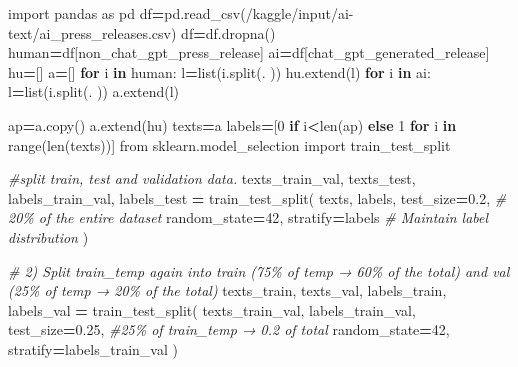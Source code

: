 \documentclass[
]{article}
\newenvironment{Shaded}{\begin{snugshade}}{\end{snugshade}}
\newcommand{\BuiltInTok}[1]{#1}
\newcommand{\CommentTok}[1]{\textcolor[rgb]{0.56,0.35,0.01}{\textit{#1}}}
\newcommand{\ControlFlowTok}[1]{\textcolor[rgb]{0.13,0.29,0.53}{\textbf{#1}}}
\newcommand{\DecValTok}[1]{\textcolor[rgb]{0.00,0.00,0.81}{#1}}
\newcommand{\FloatTok}[1]{\textcolor[rgb]{0.00,0.00,0.81}{#1}}
\newcommand{\ImportTok}[1]{#1}
\newcommand{\KeywordTok}[1]{\textcolor[rgb]{0.13,0.29,0.53}{\textbf{#1}}}
\newcommand{\NormalTok}[1]{#1}
\newcommand{\OperatorTok}[1]{\textcolor[rgb]{0.81,0.36,0.00}{\textbf{#1}}}
\newcommand{\StringTok}[1]{\textcolor[rgb]{0.31,0.60,0.02}{#1}}
\begin{document}
\begin{Shaded}
\begin{Highlighting}[]
\ImportTok{import}\NormalTok{ pandas }\ImportTok{as}\NormalTok{ pd}
\NormalTok{df}\OperatorTok{=}\NormalTok{pd.read\_csv(}\StringTok{\textquotesingle{}/kaggle/input/ai{-}text/ai\_press\_releases.csv\textquotesingle{}}\NormalTok{)}
\NormalTok{df}\OperatorTok{=}\NormalTok{df.dropna()}
\NormalTok{human}\OperatorTok{=}\NormalTok{df[}\StringTok{\textquotesingle{}non\_chat\_gpt\_press\_release\textquotesingle{}}\NormalTok{]}
\NormalTok{ai}\OperatorTok{=}\NormalTok{df[}\StringTok{\textquotesingle{}chat\_gpt\_generated\_release\textquotesingle{}}\NormalTok{]}
\NormalTok{hu}\OperatorTok{=}\NormalTok{[]}
\NormalTok{a}\OperatorTok{=}\NormalTok{[]}
\ControlFlowTok{for}\NormalTok{ i }\KeywordTok{in}\NormalTok{ human:}
\NormalTok{    l}\OperatorTok{=}\BuiltInTok{list}\NormalTok{(i.split(}\StringTok{\textquotesingle{}. \textquotesingle{}}\NormalTok{))}
\NormalTok{    hu.extend(l)}
\ControlFlowTok{for}\NormalTok{ i }\KeywordTok{in}\NormalTok{ ai:}
\NormalTok{    l}\OperatorTok{=}\BuiltInTok{list}\NormalTok{(i.split(}\StringTok{\textquotesingle{}. \textquotesingle{}}\NormalTok{))}
\NormalTok{    a.extend(l)}

\NormalTok{ap}\OperatorTok{=}\NormalTok{a.copy()}
\NormalTok{a.extend(hu)}
\NormalTok{texts}\OperatorTok{=}\NormalTok{a}
\NormalTok{labels}\OperatorTok{=}\NormalTok{[}\DecValTok{0} \ControlFlowTok{if}\NormalTok{ i}\OperatorTok{\textless{}}\BuiltInTok{len}\NormalTok{(ap) }\ControlFlowTok{else} \DecValTok{1} \ControlFlowTok{for}\NormalTok{ i }\KeywordTok{in} \BuiltInTok{range}\NormalTok{(}\BuiltInTok{len}\NormalTok{(texts))]}
\ImportTok{from}\NormalTok{ sklearn.model\_selection }\ImportTok{import}\NormalTok{ train\_test\_split}

\CommentTok{\#split train, test and validation data. }
\NormalTok{texts\_train\_val, texts\_test, labels\_train\_val, labels\_test }\OperatorTok{=}\NormalTok{ train\_test\_split(}
\NormalTok{    texts,}
\NormalTok{    labels,}
\NormalTok{    test\_size}\OperatorTok{=}\FloatTok{0.2}\NormalTok{,       }\CommentTok{\# 20\% of the entire dataset}
\NormalTok{    random\_state}\OperatorTok{=}\DecValTok{42}\NormalTok{,}
\NormalTok{    stratify}\OperatorTok{=}\NormalTok{labels      }\CommentTok{\# Maintain label distribution}
\NormalTok{)}

\CommentTok{\# 2) Split train\_temp again into train (75\% of temp → 60\% of the total) and val (25\% of temp → 20\% of the total)}
\NormalTok{texts\_train, texts\_val, labels\_train, labels\_val }\OperatorTok{=}\NormalTok{ train\_test\_split(}
\NormalTok{    texts\_train\_val,}
\NormalTok{    labels\_train\_val,}
\NormalTok{    test\_size}\OperatorTok{=}\FloatTok{0.25}\NormalTok{,      }\CommentTok{\#25\% of train\_temp → 0.2 of total}
\NormalTok{    random\_state}\OperatorTok{=}\DecValTok{42}\NormalTok{,}
\NormalTok{    stratify}\OperatorTok{=}\NormalTok{labels\_train\_val}
\NormalTok{)}


\end{Highlighting}
\end{Shaded}
\end{document}
